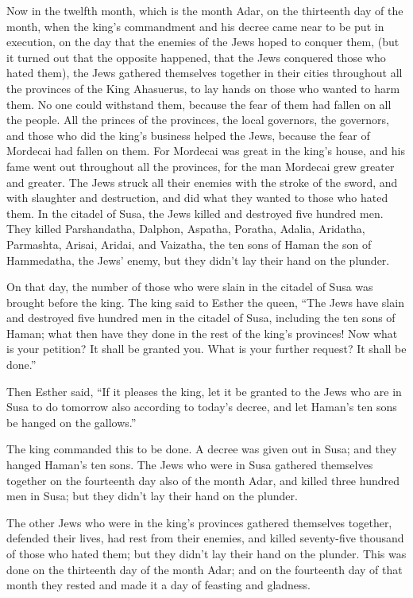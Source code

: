 \mychapter{}\myverse*{}Now in the twelfth month, which is the month Adar, on the thirteenth
day of the month, when the king’s commandment and his decree came near to be put in execution, on the
day that the enemies of the Jews hoped to conquer them, (but it turned out that the opposite happened,
that the Jews conquered those who hated them),
\myverse{}the Jews gathered themselves together in their cities throughout all the provinces
of the King Ahasuerus, to lay hands on those who wanted to harm them. No one could withstand them, because
the fear of them had fallen on all the people.
\myverse{}All the princes of the provinces, the local governors, the governors, and those
who did the king’s business helped the Jews, because the fear of Mordecai had fallen on them.
\myverse{}For Mordecai was great in the king’s house, and his fame went out throughout
all the provinces, for the man Mordecai grew greater and greater.
\myverse{}The Jews struck all their enemies with the stroke of the sword, and with slaughter
and destruction, and did what they wanted to those who hated them.
\myverse{}In the citadel of Susa, the Jews killed and destroyed five hundred men.
\myverse{}They killed Parshandatha, Dalphon, Aspatha,
\myverse{}Poratha, Adalia, Aridatha,
\myverse{}Parmashta, Arisai, Aridai, and Vaizatha,
\myverse{}the ten sons of Haman the son of Hammedatha, the Jews’ enemy, but they didn’t
lay their hand on the plunder.

\myverse{}On that day, the number of those who were slain in the citadel
of Susa was brought before the king.
\myverse{}The king said to Esther the queen, “The Jews have slain and destroyed five
hundred men in the citadel of Susa, including the ten sons of Haman; what then have they done in the rest
of the king’s provinces! Now what is your petition? It shall be granted you. What is your further request?
It shall be done.”

\myverse{}Then Esther said, “If it pleases the king, let it be granted
to the Jews who are in Susa to do tomorrow also according to today’s decree, and let Haman’s ten sons
be hanged on the gallows.”

\myverse{}The king commanded this to be done. A decree was given out in
Susa; and they hanged Haman’s ten sons.
\myverse{}The Jews who were in Susa gathered themselves together on the fourteenth day
also of the month Adar, and killed three hundred men in Susa; but they didn’t lay their hand on the plunder.

\myverse{}The other Jews who were in the king’s provinces gathered themselves
together, defended their lives, had rest from their enemies, and killed seventy-five thousand of those
who hated them; but they didn’t lay their hand on the plunder.
\myverse{}This was done on the thirteenth day of the month Adar; and on the fourteenth
day of that month they rested and made it a day of feasting and gladness.

